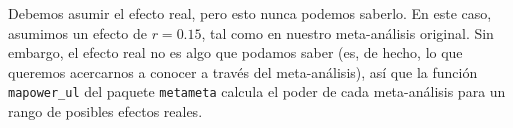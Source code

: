 \documentclass[
  bookmarksnumbered]{article}
\newenvironment{Shaded}{\begin{snugshade}}{\end{snugshade}}
\newcommand{\AttributeTok}[1]{\textcolor[rgb]{0.00,0.34,0.68}{#1}}
\newcommand{\FloatTok}[1]{\textcolor[rgb]{0.69,0.50,0.00}{#1}}
\newcommand{\FunctionTok}[1]{\textcolor[rgb]{0.39,0.29,0.61}{#1}}
\newcommand{\NormalTok}[1]{\textcolor[rgb]{0.12,0.11,0.11}{#1}}
\newcommand{\OtherTok}[1]{\textcolor[rgb]{0.00,0.43,0.16}{#1}}
\newcommand{\SpecialCharTok}[1]{\textcolor[rgb]{0.24,0.68,0.91}{#1}}
\newcommand{\StringTok}[1]{\textcolor[rgb]{0.75,0.01,0.01}{#1}}
\begin{document}
Debemos asumir el efecto real, pero esto nunca podemos saberlo. En este caso, asumimos un efecto de \(r = 0.15\), tal como en nuestro meta-análisis original. Sin embargo, el efecto real no es algo que podamos saber (es, de hecho, lo que queremos acercarnos a conocer a través del meta-análisis), así que la función \texttt{mapower\_ul} del paquete \texttt{metameta} calcula el poder de cada meta-análisis para un rango de posibles efectos reales.

\begin{Shaded}
\end{Shaded}
\end{document}
